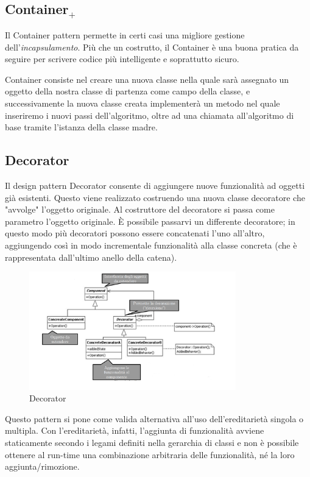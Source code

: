 \subsection{Container$_+$}
Il Container pattern permette in certi casi una migliore gestione dell'\textit{incapsulamento}. 
Più che un costrutto, il Container è una buona pratica da seguire per scrivere codice più intelligente e soprattutto sicuro. 

Container consiste nel creare una nuova classe nella quale sarà assegnato un oggetto della nostra classe di partenza come campo della classe, e successivamente la nuova classe creata implementerà un metodo nel quale inseriremo i nuovi passi dell'algoritmo, oltre ad una chiamata all'algoritmo di base tramite l'istanza della classe madre.

\subsection{Decorator}\label{decorator}
Il design pattern Decorator consente di aggiungere nuove funzionalità ad oggetti già esistenti. 
Questo viene realizzato costruendo una nuova classe decoratore che "avvolge" l'oggetto originale. 
Al costruttore del decoratore si passa come parametro l'oggetto originale. 
È possibile passarvi un differente decoratore; in questo modo più decoratori possono essere concatenati l'uno all'altro, aggiungendo così in modo incrementale funzionalità alla classe concreta (che è rappresentata dall'ultimo anello della catena).

\begin{figure}[H]
\includegraphics[width=0.8\textwidth]{res/img/DP/decorator}
\caption{Decorator}
\end{figure}

Questo pattern si pone come valida alternativa all'uso dell'ereditarietà singola o multipla. 
Con l'ereditarietà, infatti, l'aggiunta di funzionalità avviene staticamente secondo i legami definiti nella gerarchia di classi e non è possibile ottenere al run-time una combinazione arbitraria delle funzionalità, né la loro aggiunta/rimozione.

